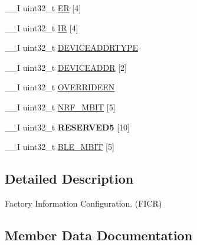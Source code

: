 \begin{DoxyCompactItemize}
\item 
\+\_\+\+\_\+\+I uint32\+\_\+t \hyperlink{struct_n_r_f___f_i_c_r___type_abb1b9886e5968d31c511f8a05c818423}{E\+R} \mbox{[}4\mbox{]}
\item 
\+\_\+\+\_\+\+I uint32\+\_\+t \hyperlink{struct_n_r_f___f_i_c_r___type_aa89ff03dd5a8432f7338201b13f917f5}{I\+R} \mbox{[}4\mbox{]}
\item 
\+\_\+\+\_\+\+I uint32\+\_\+t \hyperlink{struct_n_r_f___f_i_c_r___type_a2414378f6311866cc2c13dc36e385f43}{D\+E\+V\+I\+C\+E\+A\+D\+D\+R\+T\+Y\+P\+E}
\item 
\+\_\+\+\_\+\+I uint32\+\_\+t \hyperlink{struct_n_r_f___f_i_c_r___type_a7bfb2fbde6d426c6bb411d9c0c0d3567}{D\+E\+V\+I\+C\+E\+A\+D\+D\+R} \mbox{[}2\mbox{]}
\item 
\+\_\+\+\_\+\+I uint32\+\_\+t \hyperlink{struct_n_r_f___f_i_c_r___type_afa93a38de5f26a83b644b1f43ffe417f}{O\+V\+E\+R\+R\+I\+D\+E\+E\+N}
\item 
\+\_\+\+\_\+\+I uint32\+\_\+t \hyperlink{struct_n_r_f___f_i_c_r___type_a43e7f01b38aac71ea0d002868f4e0d13}{N\+R\+F\+\_\+M\+B\+I\+T} \mbox{[}5\mbox{]}
\item 
\hypertarget{struct_n_r_f___f_i_c_r___type_a080f5b614859aae665fc979bb206399b}{}\+\_\+\+\_\+\+I uint32\+\_\+t {\bfseries R\+E\+S\+E\+R\+V\+E\+D5} \mbox{[}10\mbox{]}\label{struct_n_r_f___f_i_c_r___type_a080f5b614859aae665fc979bb206399b}

\item 
\+\_\+\+\_\+\+I uint32\+\_\+t \hyperlink{struct_n_r_f___f_i_c_r___type_a2f2d277a2cada34b0165e55a33027d86}{B\+L\+E\+\_\+M\+B\+I\+T} \mbox{[}5\mbox{]}
\end{DoxyCompactItemize}


\subsection{Detailed Description}
Factory Information Configuration. (F\+I\+C\+R) 

\subsection{Member Data Documentation}
\hypertarget{struct_n_r_f___f_i_c_r___type_a2f2d277a2cada34b0165e55a33027d86}{}
